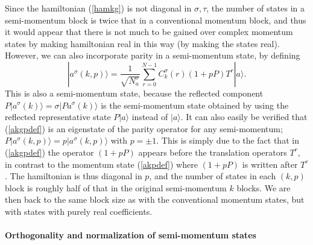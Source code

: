 \documentclass[draft,numberedheadings]{aipproc}
\begin{document}
Since the hamiltonian (\ref{hamkg}) is not diagonal 
in $\sigma,\tau$, the number of states in a semi-momentum block is twice that in a conventional momentum block, and thus it would appear that there is
not much to be gained over complex momentum states by making hamiltonian real in this way (by making the states real). However, we can also incorporate 
parity in a semi-momentum state, by defining 
\begin{equation}
|a^\sigma(k,p)\rangle = \frac{1}{\sqrt{N^\sigma_a}}\sum_{r=0}^{N-1}C^\sigma_k(r)(1 + pP)T^r|a\rangle .
\label{akgpdef}
\end{equation}
This is also a semi-momentum state, because the reflected component $P|a^\sigma(k)\rangle=\sigma|Pa^\sigma(k)\rangle$ is the semi-momentum state obtained by 
using the reflected representative state $P|a\rangle$ instead of $|a\rangle$. It can also easily be verified that (\ref{akgpdef}) is an eigenstate of the 
parity operator for any semi-momentum; $P|a^\sigma(k,p)\rangle=p|a^\sigma(k,p)\rangle$ with $p=\pm 1$. This is simply due to the fact that in (\ref{akgpdef}) 
the operator $(1+pP)$ appears before the translation operators $T^r$, in contrast to the momentum state (\ref{akpdef}) where  $(1+pP)$ is written after $T^r$. 
The hamiltonian is thus diagonal in $p$, and the number of states in each $(k,p)$ block is roughly half of that in the original semi-momentum $k$ blocks. 
We are then back to the same block size as with the conventional momentum states, but with states with purely real coefficients. 

\paragraph{Orthogonality and normalization of semi-momentum states}
\end{document}
